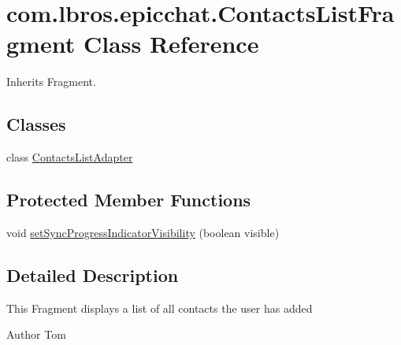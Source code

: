 \hypertarget{classcom_1_1lbros_1_1epicchat_1_1_contacts_list_fragment}{\section{com.\-lbros.\-epicchat.\-Contacts\-List\-Fragment Class Reference}
\label{classcom_1_1lbros_1_1epicchat_1_1_contacts_list_fragment}
}


Inherits Fragment.

\subsection*{Classes}
\begin{DoxyCompactItemize}
\item 
class \hyperlink{classcom_1_1lbros_1_1epicchat_1_1_contacts_list_fragment_1_1_contacts_list_adapter}{Contacts\-List\-Adapter}
\end{DoxyCompactItemize}
\subsection*{Protected Member Functions}
\begin{DoxyCompactItemize}
\item 
void \hyperlink{classcom_1_1lbros_1_1epicchat_1_1_contacts_list_fragment_a52abef3212a1cf4e0b9783adf00db9bf}{set\-Sync\-Progress\-Indicator\-Visibility} (boolean visible)
\end{DoxyCompactItemize}


\subsection{Detailed Description}
This Fragment displays a list of all contacts the user has added \begin{DoxyAuthor}{Author}
Tom 
\end{DoxyAuthor}


